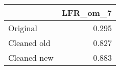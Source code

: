 \begin{tabular}{lr}
\toprule
{} & LFR_om_7 \\
\midrule
Original    &    0.295 \\
Cleaned old &    0.827 \\
Cleaned new &    0.883 \\
\bottomrule
\end{tabular}
